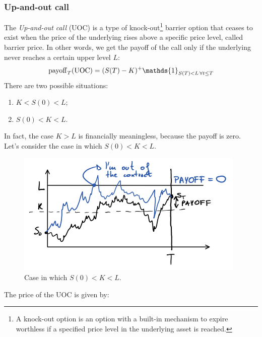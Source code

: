 \subsubsection{Up-and-out call}
The \emph{Up-and-out call} (UOC) is a type of knock-out\footnote{A knock-out option is an option with a built-in mechanism to expire worthless if a specified price level in the underlying asset is reached.} barrier option that ceases to exist when the price of the underlying rises above a specific price level, called barrier price. In other words, we get the payoff of the call only if the underlying never reaches a certain upper level $L$:
\begin{equation}
    \pay_T(\uoc) = (S(T)-K)^+\mathds{1}_{S(T)<L\,\forall t\le T}
\end{equation}
There are two possible situations:
\begin{enumerate}
    \item $K<S(0)<L$;
    \item $S(0)<K<L$.
\end{enumerate}
In fact, the case $K>L$ is financially meaningless, because the payoff is zero. \\
Let's consider the case in which $S(0)<K<L$.
\begin{figure}[h]
    \centering
    \includegraphics[scale=0.35]{fig/tmp/fig36.png}
    \caption{Case in which $S(0)<K<L$.}
    \label{fig:uoc}
\end{figure}
The price of the UOC is given by:
